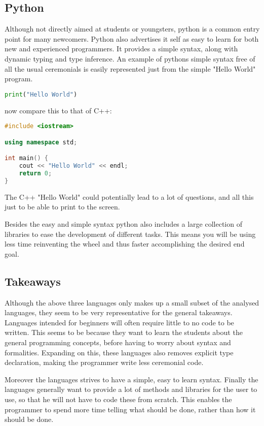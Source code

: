 \subsection{Python}
Although not directly aimed at students or youngsters, python is a common entry point for many newcomers. 
Python also advertises it self as easy to learn for both new and experienced programmers. 
It provides a simple syntax, along with dynamic typing and type inference.\cite{PythonWebsite}
An example of pythons simple syntax free of all the usual ceremonials is easily represented just from the simple "Hello World" program.

\begin{lstlisting}[language=Python,label=lis:PythonHelloWorld,caption=Hello World in python]
print("Hello World")
\end{lstlisting}

now compare this to that of C++:

\begin{lstlisting}[language=C++,label=lis:C++HelloWorld,caption=Hello World in C++]
#include <iostream>

using namespace std;

int main() {
	cout << "Hello World" << endl;
	return 0;
}
\end{lstlisting}

The C++ "Hello World" could potentially lead to a lot of questions, and all this just to be able to print to the screen.

Besides the easy and simple syntax python also includes a large collection of libraries to ease the development of different tasks.\cite{PythonLibraries}
This means you will be using less time reinventing the wheel and thus faster accomplishing the desired end goal.\cite{PythonXKCD}

\subsection{Takeaways}
Although the above three languages only makes up a small subset of the analysed languages, they seem to be very representative for the general takeaways. 
Languages intended for beginners will often require little to no code to be written. 
This seems to be because they want to learn the students about the general programming concepts, before having to worry about syntax and formalities. 
Expanding on this, these languages also removes explicit type declaration, making the programmer write less ceremonial code.

Moreover the languages strives to have a simple, easy to learn syntax. 
Finally the languages generally want to provide a lot of methods and libraries for the user to use, so that he will not have to code these from scratch. 
This enables the programmer to spend more time telling what should be done, rather than how it should be done.